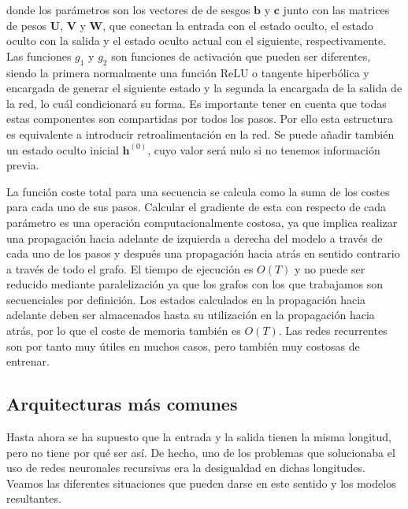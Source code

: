 donde los parámetros son los vectores de de sesgos $\textbf{b}$ y $\textbf{c}$ junto con las matrices de pesos $\textbf{U}$, $\textbf{V}$ y $\textbf{W}$, que conectan la entrada con el estado oculto, el estado oculto con la salida y el estado oculto actual con el siguiente, respectivamente. Las funciones $g_1$ y $g_2$ son funciones de activación que pueden ser diferentes, siendo la primera normalmente una función ReLU o tangente hiperbólica y encargada de generar el siguiente estado y la segunda la encargada de la salida de la red, lo cuál condicionará su forma. Es importante tener en cuenta que todas estas componentes son compartidas por todos los pasos. Por ello esta estructura es equivalente a introducir retroalimentación en la red. Se puede añadir también un estado oculto inicial $\textbf{h}^{(0)}$, cuyo valor será nulo si no tenemos información previa.

La función coste total para una secuencia se calcula como la suma de los costes para cada uno de sus pasos. Calcular el gradiente de esta con respecto de cada parámetro es una operación computacionalmente costosa, ya que implica realizar una propagación hacia adelante de izquierda a derecha del modelo a través de cada uno de los pasos y después una propagación hacia atrás en sentido contrario a través de todo el grafo. El tiempo de ejecución es $O(T)$ y no puede ser reducido mediante paralelización ya que los grafos con los que trabajamos son secuenciales por definición. Los estados calculados en la propagación hacia adelante deben ser almacenados hasta su utilización en la propagación hacia atrás, por lo que el coste de memoria también es $O(T)$. Las redes recurrentes son por tanto muy útiles en muchos casos, pero también muy costosas de entrenar.

\subsection{Arquitecturas más comunes}

Hasta ahora se ha supuesto que la entrada y la salida tienen la misma longitud, pero no tiene por qué ser así. De hecho, uno de los problemas que solucionaba el uso de redes neuronales recursivas era la desigualdad en dichas longitudes. Veamos las diferentes situaciones que pueden darse en este sentido y los modelos resultantes.

